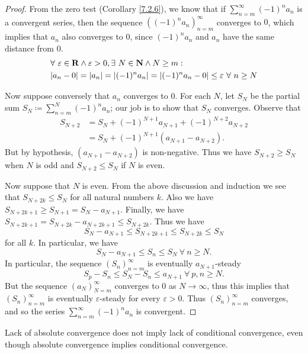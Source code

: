 \begin{proof}
From the zero test (Corollary \ref{7.2.6}), we know that if \(\sum_{n = m}^\infty (-1)^n a_n\) is a convergent series, then the sequence \(((-1)^n a_n)_{n = m}^\infty\) converges to \(0\), which implies that \(a_n\) also converges to \(0\), since \((-1)^n a_n\) and \(a_n\) have the same distance from \(0\).
\begin{align*}
& \forall\ \varepsilon \in \mathbf{R} \land \varepsilon > 0, \exists\ N \in \mathbf{N} \land N \geq m : \\
& \abs*{a_n - 0} = \abs*{a_n} = \abs*{(-1)^n a_n} = \abs*{(-1)^n a_n - 0} \leq \varepsilon \ \forall\ n \geq N
\end{align*}

Now suppose conversely that \(a_n\) converges to \(0\).
For each \(N\), let \(S_N\) be the partial sum \(S_N \coloneqq \sum_{n = m}^N (-1)^n a_n\);
our job is to show that \(S_N\) converges.
Observe that
\begin{align*}
S_{N + 2} &= S_N + (-1)^{N + 1} a_{N + 1} + (-1)^{N + 2} a_{N + 2} \\
&= S_N + (-1)^{N + 1} (a_{N + 1} - a_{N + 2}).
\end{align*}
But by hypothesis, \((a_{N + 1} - a_{N + 2})\) is non-negative.
Thus we have \(S_{N + 2} \geq S_N\) when \(N\) is odd and \(S_{N + 2} \leq S_N\) if \(N\) is even.

Now suppose that \(N\) is even.
From the above discussion and induction we see that \(S_{N + 2k} \leq S_N\) for all natural numbers \(k\).
Also we have \(S_{N + 2k + 1} \geq S_{N + 1} = S_N - a_{N + 1}\).
Finally, we have \(S_{N + 2k + 1} = S_{N + 2k} - a_{N + 2k + 1} \leq S_{N + 2k}\).
Thus we have
\[
    S_N - a_{N + 1} \leq S_{N + 2k + 1} \leq S_{N + 2k} \leq S_N
\]
for all \(k\).
In particular, we have
\[
    S_N - a_{N + 1} \leq S_n \leq S_N \ \forall\ n \geq N.
\]
In particular, the sequence \((S_n)_{n = m}^\infty\) is eventually \(a_{N + 1}\)-steady
\[
    S_p - S_n \leq S_N - S_n \leq a_{N + 1} \ \forall\ p, n \geq N.
\]
But the sequence \((a_N)_{N = m}^\infty\) converges to \(0\) as \(N \to \infty\), thus this implies that \((S_n)_{n = m}^\infty\) is eventually \(\varepsilon\)-steady for every \(\varepsilon > 0\).
Thus \((S_n)_{n = m}^\infty\) converges, and so the series \(\sum_{n = m}^\infty (-1)^n a_n\) is convergent.
\end{proof}

\begin{note}
Lack of absolute convergence does not imply lack of conditional convergence, even though absolute convergence implies conditional convergence.
\end{note}

